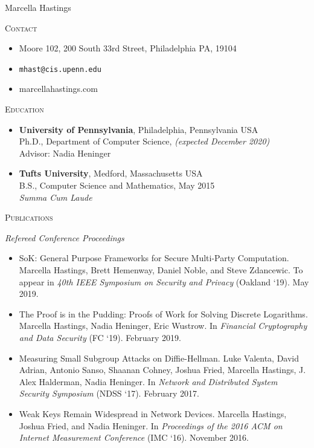\documentclass{article}
\begin{document}
Marcella Hastings

\hrulefill

\textsc{Contact}
\begin{itemize}[label={},noitemsep]
  \item Moore 102, 200 South 33rd Street, Philadelphia PA, 19104
  \item \texttt{mhast@cis.upenn.edu}
  \item marcellahastings.com
\end{itemize}

\textsc{Education}
\begin{itemize}[label={}]
  \item \textbf{University of Pennsylvania}, Philadelphia, Pennsylvania USA \\
    Ph.D., Department of Computer Science, \textit{(expected December 2020)}\\
    Advisor: Nadia Heninger 
    
  \item \textbf{Tufts University}, Medford, Massachusetts USA \\
    B.S., Computer Science and Mathematics, May 2015 \\
    \textit{Summa Cum Laude}
\end{itemize}

\textsc{Publications}

\textit{Refereed Conference Proceedings}
\begin{itemize}[label={}]
\item SoK: General Purpose Frameworks for Secure Multi-Party Computation. 
Marcella Hastings, Brett Hemenway, Daniel Noble, and Steve Zdancewic.
To appear in \textit{40th IEEE Symposium on Security and Privacy} (Oakland `19). May 2019.
\item The Proof is in the Pudding: Proofs of Work for Solving Discrete Logarithms.
Marcella Hastings, Nadia Heninger, Eric Wustrow.
In \emph{Financial Cryptography and Data Security} (FC `19). February 2019.
\item Measuring Small Subgroup Attacks on Diffie-Hellman. 
Luke Valenta, David Adrian, Antonio Sanso, Shaanan Cohney, Joshua Fried, Marcella Hastings, J. Alex Halderman, Nadia Heninger. 
In \textit{Network and Distributed System Security Symposium} (NDSS `17). February 2017.
\item Weak Keys Remain Widespread in Network Devices. 
Marcella Hastings, Joshua Fried, and Nadia Heninger. 
In \textit{Proceedings of the 2016 ACM on Internet Measurement Conference} (IMC `16). November 2016.
\end{itemize}
\end{document}
